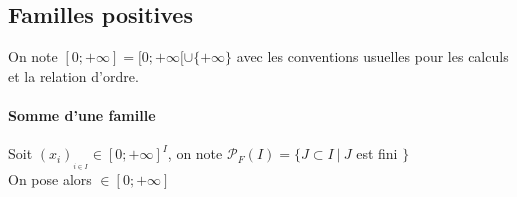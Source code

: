 	\subsection{Familles positives}
		On note $[0;+\infty] = [0;+\infty[ \cup \{+\infty\}$ avec les conventions usuelles pour les calculs et la relation d'ordre.\\
		\traitd
		\paragraph{Somme d'une famille}
			Soit $(x_i)_{_{i\in I}}\in [0;+\infty]^I$, on note $\mathcal{P}_F(I) = \{J\subset I~|~J$ est fini $\}$\\
			On pose alors  $\in [0;+\infty]$ \vspace*{0.1cm} \trait
		 \\ \traitd
